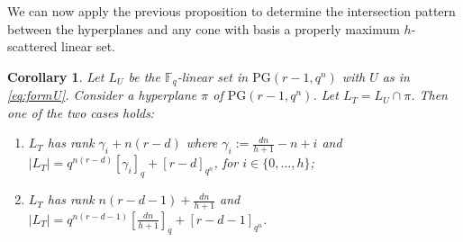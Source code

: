 \documentclass[11pt]{amsart}
\newtheorem{lemma}[theorem]{Lemma}
\newtheorem{corollary}[theorem]{Corollary}
\newcommand{\F}{{\mathbb F}}
\newcommand{\PG}{\mathrm{PG}}
\newcommand{\sam}[1]{\textcolor{purple}{#1}}
\begin{document}


We can now apply the previous proposition to determine the intersection pattern between the hyperplanes and any cone with basis a properly maximum $h$-scattered linear set.

\begin{corollary} \label{lem:intersectioninfinity}
Let $L_U$ be the $\F_q$-linear set in $\PG(r-1,q^n)$ with $U$ as in \eqref{eq:formU}. Consider a hyperplane $\pi$ of $\PG(r-1,q^n)$. Let $L_T=L_U \cap \pi$. Then one of the two cases holds:
\begin{enumerate}
    \item $L_T$ has rank $\gamma_i+n(r-d)$ where $\gamma_i:=\frac{dn}{h+1}-n+i$ and %
    $|L_T|=q^{n(r-d)}\left[\gamma_i\right]_q+[r-d]_{q^n}$, for $i\in \{0,\ldots, h\}$;
    \item $L_T$ has rank $n(r-d-1)+\frac{dn}{h+1}$ and $\lvert L_T \rvert=q^{n(r-d-1)}\left[\frac{dn}{h+1} \right]_q+[r-d-1]_{q^n}$.
    
\end{enumerate}
\end{corollary}
\end{document}
